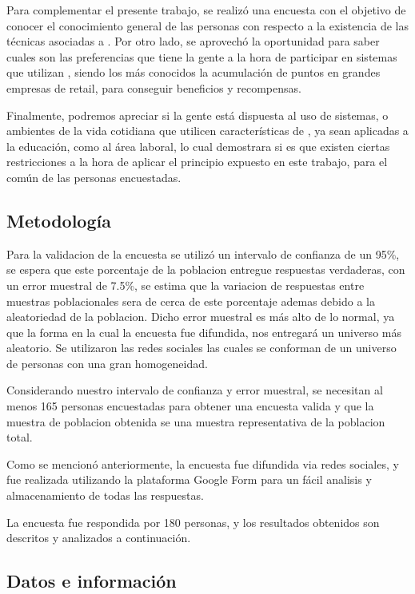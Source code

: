 Para complementar el presente trabajo, se realizó una encuesta con el objetivo de
conocer el conocimiento general de las personas con respecto a la existencia
de las técnicas asociadas a {\GAM}.
Por otro lado, se aprovechó la oportunidad para saber cuales son las preferencias
que tiene la gente a la hora de participar en sistemas que utilizan {\GAM},
siendo los más conocidos la acumulación de puntos en grandes empresas de retail,
para conseguir beneficios y recompensas.

Finalmente, podremos apreciar si la gente está dispuesta al uso de sistemas,
o ambientes de la vida cotidiana que utilicen características de {\GAM},
ya sean aplicadas a la educación, como al área laboral, lo cual demostrara
 si es que existen ciertas restricciones a la hora de aplicar
el principio expuesto en este trabajo, para el común de las personas
encuestadas.

\subsection{Metodología}

Para la validacion de la encuesta se utilizó un intervalo de confianza de un 95\%, se espera que
este porcentaje de la poblacion entregue respuestas verdaderas, con un error
muestral de 7.5\%, se estima que la variacion de respuestas entre muestras poblacionales
 sera de cerca de este porcentaje ademas debido a la aleatoriedad de la poblacion.
Dicho error muestral es más alto de lo normal, ya que la forma en la cual la encuesta fue difundida,
 nos entregará un universo más aleatorio. Se utilizaron las redes sociales las cuales 
se conforman de un universo de personas con una gran homogeneidad.

Considerando nuestro intervalo de confianza y error muestral, se necesitan al menos 165
personas encuestadas para obtener una encuesta valida y que la muestra de poblacion obtenida
se una muestra representativa de la poblacion total.

Como se mencionó anteriormente, la encuesta fue difundida via redes sociales,
y fue realizada utilizando la plataforma Google Form para un fácil analisis y almacenamiento
 de todas las respuestas.

La encuesta fue respondida por 180 personas, y los resultados obtenidos son descritos y
analizados a continuación.

\subsection{Datos e información}

